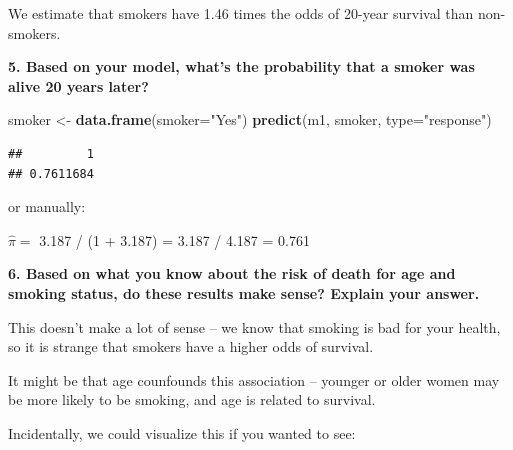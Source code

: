 \documentclass[]{article}
\newenvironment{Shaded}{\begin{snugshade}}{\end{snugshade}}
\newcommand{\DataTypeTok}[1]{\textcolor[rgb]{0.13,0.29,0.53}{#1}}
\newcommand{\KeywordTok}[1]{\textcolor[rgb]{0.13,0.29,0.53}{\textbf{#1}}}
\newcommand{\NormalTok}[1]{#1}
\newcommand{\StringTok}[1]{\textcolor[rgb]{0.31,0.60,0.02}{#1}}
\begin{document}
We estimate that smokers have 1.46 times the odds of 20-year survival
than non-smokers.

\vspace{0.25in}

\textbf{5. Based on your model, what's the probability that a smoker was
alive 20 years later?}

\begin{Shaded}
\begin{Highlighting}[]
\NormalTok{smoker <-}\StringTok{ }\KeywordTok{data.frame}\NormalTok{(}\DataTypeTok{smoker=}\StringTok{"Yes"}\NormalTok{)}
\KeywordTok{predict}\NormalTok{(m1, smoker, }\DataTypeTok{type=}\StringTok{"response"}\NormalTok{)}
\end{Highlighting}
\end{Shaded}

\begin{verbatim}
##         1 
## 0.7611684
\end{verbatim}

or manually:

\(\hat\pi=\) 3.187 / (1 + 3.187) = 3.187 / 4.187 = 0.761

\vspace{0.25in}

\textbf{6. Based on what you know about the risk of death for age and
smoking status, do these results make sense? Explain your answer.}

This doesn't make a lot of sense -- we know that smoking is bad for your
health, so it is strange that smokers have a higher odds of survival.

It might be that age counfounds this association -- younger or older
women may be more likely to be smoking, and age is related to survival.

Incidentally, we could visualize this if you wanted to see:
\end{document}
